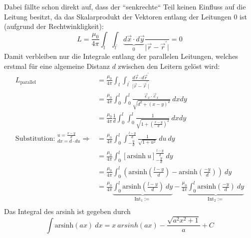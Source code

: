 \documentclass[11pt a4paper]{article}
\newcommand{\arsinh}{\text{arsinh}}
\begin{document}
Dabei fällte schon direkt auf, dass der ``senkrechte`` Teil keinen Einfluss auf die Leitung besitzt, da das 
Skalarprodukt der Vektoren entlang der Leitungen 0 ist (aufgrund der Rechtwinkligkeit):
\[ 	
	L = \frac{\mu_0}{4\pi} \int_{l} 
	\int_{l^\prime} \underbrace{d\vec x \cdot d\vec y}_{0} \frac{}{\vert \vec r - \vec r^\prime \vert}
	= 0
\]
Damit verbleiben nur die Integrale entlang der parallelen Leitungen, welches erstmal für eine algemeine Distanz
$d$ zwischen den Leitern gelöst wird:
\begin{align*}
	L_\text{parallel} 
	&= \frac{\mu_0}{4\pi} \int_l \int_{l^\prime} 
	\frac{d\vec r \cdot d\vec r^\prime}{\vert \vec r - \vec r^\prime \vert} \\
	&= \frac{\mu_0}{4\pi} \int_0^l \int_0^l
	\frac{\vec e_x \cdot \vec e_x}{\sqrt{d^2 + (x-y)^2}} \ dx dy \\
	&= \frac{\mu_0}{4\pi} \frac 1d \int_0^l \int_0^l
	\frac{1}{\sqrt{1 + \left( \frac{x-y}{d} \right) ^2}} \ dx dy \\
	\text{Substitution: } ^{u = \frac{x-y}{d}} _{dx = d \cdot du} \Rightarrow
	&= \frac{\mu_0}{4\pi} \int_0^l \int_{-\frac yd}^{\frac{l-y}{d}}
	\frac{1}{\sqrt{1 + u^2}} \ du \ dy \\
	&= \frac{\mu_0}{4\pi} \int_0^l 
	\left[ \arsinh \ u \right]_{-\frac yd}^{\frac{l-y}{d}}
	 \ dy \\
	&= \frac{\mu_0}{4\pi} \int_0^l 
	\left( \arsinh \left(\frac{l-y}{d}\right) - \arsinh \left(\frac{-y}{d} \right) \right)
	 \ dy \\
	&= \frac{\mu_0}{4\pi} \underbrace{\int_0^l 
	\arsinh \left(\frac{l-y}{d}\right) \ dy}_{\text{Int}_1 :=}
	- \frac{\mu_0}{4\pi} \underbrace{\int_0^l \arsinh \left(\frac{-y}{d} \right) \ dy}_{\text{Int}_2 := } \\
\end{align*}
Das Integral des arsinh ist gegeben durch
\[ \int \arsinh(ax) \ dx = x \ arsinh(ax) - \frac{\sqrt{a^2x^2 + 1}}{a} + C \]
\end{document}
